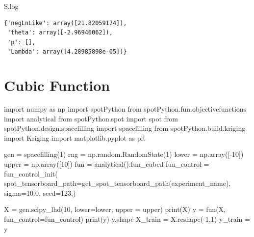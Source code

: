 \documentclass[
  letterpaper,
  DIV=11,
  numbers=noendperiod]{scrreprt}
\newenvironment{Shaded}{\begin{snugshade}}{\end{snugshade}}
\newcommand{\BuiltInTok}[1]{\textcolor[rgb]{0.00,0.23,0.31}{#1}}
\newcommand{\DecValTok}[1]{\textcolor[rgb]{0.68,0.00,0.00}{#1}}
\newcommand{\FloatTok}[1]{\textcolor[rgb]{0.68,0.00,0.00}{#1}}
\newcommand{\ImportTok}[1]{\textcolor[rgb]{0.00,0.46,0.62}{#1}}
\newcommand{\NormalTok}[1]{\textcolor[rgb]{0.00,0.23,0.31}{#1}}
\newcommand{\OperatorTok}[1]{\textcolor[rgb]{0.37,0.37,0.37}{#1}}
\begin{document}
\begin{Shaded}
\begin{Highlighting}[]
\NormalTok{S.log}
\end{Highlighting}
\end{Shaded}

\begin{verbatim}
{'negLnLike': array([21.82059174]),
 'theta': array([-2.96946062]),
 'p': [],
 'Lambda': array([4.28985898e-05])}
\end{verbatim}

\hypertarget{cubic-function}{%
\section{Cubic Function}\label{cubic-function}}

\begin{Shaded}
\begin{Highlighting}[]
\ImportTok{import}\NormalTok{ numpy }\ImportTok{as}\NormalTok{ np}
\ImportTok{import}\NormalTok{ spotPython}
\ImportTok{from}\NormalTok{ spotPython.fun.objectivefunctions }\ImportTok{import}\NormalTok{ analytical}
\ImportTok{from}\NormalTok{ spotPython.spot }\ImportTok{import}\NormalTok{ spot}
\ImportTok{from}\NormalTok{ spotPython.design.spacefilling }\ImportTok{import}\NormalTok{ spacefilling}
\ImportTok{from}\NormalTok{ spotPython.build.kriging }\ImportTok{import}\NormalTok{ Kriging}
\ImportTok{import}\NormalTok{ matplotlib.pyplot }\ImportTok{as}\NormalTok{ plt}

\NormalTok{gen }\OperatorTok{=}\NormalTok{ spacefilling(}\DecValTok{1}\NormalTok{)}
\NormalTok{rng }\OperatorTok{=}\NormalTok{ np.random.RandomState(}\DecValTok{1}\NormalTok{)}
\NormalTok{lower }\OperatorTok{=}\NormalTok{ np.array([}\OperatorTok{{-}}\DecValTok{10}\NormalTok{])}
\NormalTok{upper }\OperatorTok{=}\NormalTok{ np.array([}\DecValTok{10}\NormalTok{])}
\NormalTok{fun }\OperatorTok{=}\NormalTok{ analytical().fun\_cubed}
\NormalTok{fun\_control }\OperatorTok{=}\NormalTok{ fun\_control\_init(}
\NormalTok{    spot\_tensorboard\_path}\OperatorTok{=}\NormalTok{get\_spot\_tensorboard\_path(experiment\_name),}
\NormalTok{    sigma}\OperatorTok{=}\FloatTok{10.0}\NormalTok{,}
\NormalTok{    seed}\OperatorTok{=}\DecValTok{123}\NormalTok{,)}

\NormalTok{X }\OperatorTok{=}\NormalTok{ gen.scipy\_lhd(}\DecValTok{10}\NormalTok{, lower}\OperatorTok{=}\NormalTok{lower, upper }\OperatorTok{=}\NormalTok{ upper)}
\BuiltInTok{print}\NormalTok{(X)}
\NormalTok{y }\OperatorTok{=}\NormalTok{ fun(X, fun\_control}\OperatorTok{=}\NormalTok{fun\_control)}
\BuiltInTok{print}\NormalTok{(y)}
\NormalTok{y.shape}
\NormalTok{X\_train }\OperatorTok{=}\NormalTok{ X.reshape(}\OperatorTok{{-}}\DecValTok{1}\NormalTok{,}\DecValTok{1}\NormalTok{)}
\NormalTok{y\_train }\OperatorTok{=}\NormalTok{ y}


\end{Highlighting}
\end{Shaded}
\end{document}

